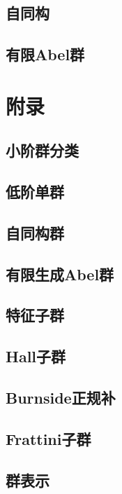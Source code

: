 \subsection{自同构}


\subsection{有限Abel群}

\section{附录}

\subsection{小阶群分类}

\subsection{低阶单群}

\subsection{自同构群}

\subsection{有限生成Abel群}

\subsection{特征子群}

\subsection{Hall子群}

\subsection{Burnside正规补}

\subsection{Frattini子群}

\subsection{群表示}
